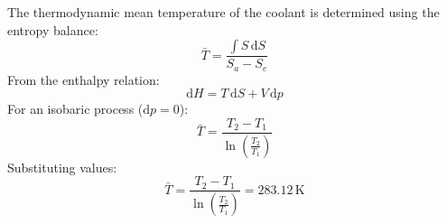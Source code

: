 The thermodynamic mean temperature of the coolant is determined using the entropy balance:  
\[
\bar{T} = \frac{\int S \, \text{d}S}{S_a - S_e}
\]  
From the enthalpy relation:  
\[
\text{d}H = T \, \text{d}S + V \, \text{d}p
\]  
For an isobaric process (\( \text{d}p = 0 \)):  
\[
\bar{T} = \frac{T_2 - T_1}{\ln \left( \frac{T_2}{T_1} \right)}
\]  
Substituting values:  
\[
\bar{T} = \frac{T_2 - T_1}{\ln \left( \frac{T_2}{T_1} \right)} = 283.12 \, \text{K}
\]